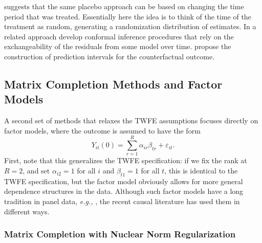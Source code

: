 \documentclass[letterpaper,12pt,leqno]{article}
\begin{document}
\citep*{doudchenko2016balancing} suggests that the same placebo approach can be based on changing the time period that was treated. Essentially here the idea is to think of the time of the treatment as random, generating a randomization distribution of estimates.
In a related approach \citep*{chernozhukov2021exact, viviano2023synthetic, lei2021conformal} 
develop conformal inference procedures that rely on the exchangeability of the residuals from some model over time.
 \citep*{cattaneo2021prediction}  propose the construction of prediction intervals for the counterfactual outcome.

\subsection{Matrix Completion  Methods and Factor Models}\label{section:matrix}


A second set of methods that relaxes the TWFE assumptions focuses directly on factor models, where the outcome is assumed to have the form
\begin{equation}\label{factor} Y_{it}(0)=\sum_{r=1}^R \alpha_{ir}\beta_{tr}+\varepsilon_{it}.\end{equation}
First, note that this generalizes the TWFE specification: if we fix the rank at $R=2$, and set $\alpha_{i2}=1$ for all $i$ and $\beta_{t1}=1$ for all $t$, this is identical to the TWFE specification, but the factor model obviously allows for more general dependence structures in the data.
Although such factor models have a long tradition in panel data, {\it e.g.,} \citep{anderson1984estimating,chamberlain1983arbitrage,stock1998diffusion, bai2002determining,bai2009panel}, the recent causal literature has used them in different ways.

\subsubsection{Matrix Completion with Nuclear Norm Regularization}
\end{document}
